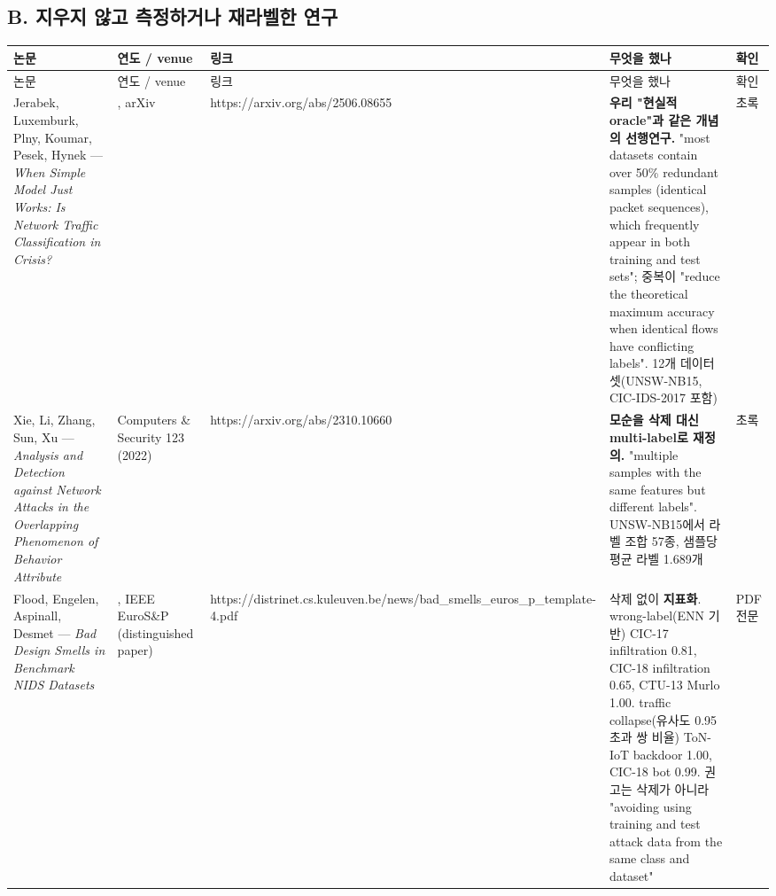 \subsection{B. 지우지 않고 측정하거나 재라벨한 연구}
\begingroup
\footnotesize
\begin{longtable}{>{\raggedright\arraybackslash}p{}>{\raggedright\arraybackslash}p{}>{\raggedright\arraybackslash}p{}>{\raggedright\arraybackslash}p{}>{\raggedright\arraybackslash}p{}}
\toprule
논문 & 연도 /\allowbreak{} venue & 링크 & 무엇을 했나 & 확인 \\ \midrule
\endfirsthead
논문 & 연도 /\allowbreak{} venue & 링크 & 무엇을 했나 & 확인 \\ \midrule
\endhead
{}Jerabek, Luxemburk, Plny, Koumar, Pesek, Hynek — \emph{When Simple Model Just Works: Is Network Traffic Classification in Crisis?} & 2025, arXiv & https:/\allowbreak{}/\allowbreak{}arxiv.org/\allowbreak{}abs/\allowbreak{}2506.08655 & \textbf{우리 "현실적 oracle"과 같은 개념의 선행연구.} "most datasets contain over 50\% redundant samples (identical packet sequences), which frequently appear in both training and test sets"; 중복이 "reduce the theoretical maximum accuracy when identical flows have conflicting labels". 12개 데이터셋(UNSW-NB15, CIC-IDS-2017 포함) & 초록 \\
{}Xie, Li, Zhang, Sun, Xu — \emph{Analysis and Detection against Network Attacks in the Overlapping Phenomenon of Behavior Attribute} & Computers \& Security 123 (2022) & https:/\allowbreak{}/\allowbreak{}arxiv.org/\allowbreak{}abs/\allowbreak{}2310.10660 & \textbf{모순을 삭제 대신 multi-label로 재정의.} "multiple samples with the same features but different labels". UNSW-NB15에서 라벨 조합 57종, 샘플당 평균 라벨 1.689개 & 초록 \\
{}Flood, Engelen, Aspinall, Desmet — \emph{Bad Design Smells in Benchmark NIDS Datasets} & 2024, IEEE EuroS\&P (distinguished paper) & https:/\allowbreak{}/\allowbreak{}distrinet.\allowbreak{}cs.\allowbreak{}kuleuven.\allowbreak{}be/\allowbreak{}news/\allowbreak{}bad\_\allowbreak{}smells\_\allowbreak{}euros\_\allowbreak{}p\_\allowbreak{}template-4.pdf & 삭제 없이 \textbf{지표화}. wrong-label(ENN 기반) CIC-17 infiltration 0.81, CIC-18 infiltration 0.65, CTU-13 Murlo 1.00. traffic collapse(유사도 0.95 초과 쌍 비율) ToN-IoT backdoor 1.00, CIC-18 bot 0.99. 권고는 삭제가 아니라 "avoiding using training and test attack data from the same class and dataset" & PDF 전문 \\

\end{longtable}
